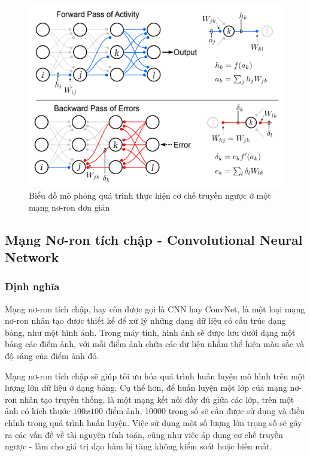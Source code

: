 \begin{figure}[H]
    \centering
    \includegraphics{pics/Chapter3/backprop.png}
    \caption{Biểu đồ mô phỏng quá trình thực hiện cơ chế truyền ngược ở một mạng nơ-ron đơn giản \cite{lillicrap2020backpropagation}}
    \label{fig:enter-label}
\end{figure}

\subsection{Mạng Nơ-ron tích chập - Convolutional Neural Network}
\subsubsection*{Định nghĩa}
Mạng nơ-ron tích chập, hay còn được gọi là CNN hay ConvNet, là một loại mạng nơ-ron nhân tạo được thiết kế để xử lý những dạng dữ liệu có cấu trúc dạng bảng, như một hình ảnh. Trong máy tính, hình ảnh sẽ được lưu dưới dạng một bảng các điểm ảnh, với mỗi điểm ảnh chứa các dữ liệu nhằm thể hiện màu sắc và độ sáng của điểm ảnh đó. 


Mạng nơ-ron tích chập sẽ giúp tối ưu hóa quá trình huấn luyện mô hình trên một lượng lớn dữ liệu ở dạng bảng. Cụ thể hơn, để huấn luyện một lớp của mạng nơ-ron nhân tạo truyền thống, là một mạng kết nối đầy đủ giữa các lớp, trên một ảnh có kích thước $100x100$ điểm ảnh, 10000 trọng số sẽ cần được sử dụng và điều chỉnh trong quá trình huấn luyện. Việc sử dụng một số lượng lớn trọng số sẽ gây ra các vấn đề về tài nguyên tính toán, cũng như việc áp dụng cơ chế truyền ngược - làm cho giá trị đạo hàm bị tăng không kiểm soát hoặc biến mất.


